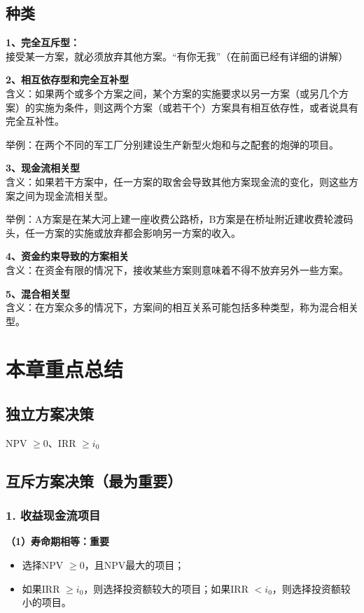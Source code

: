 \subsection{种类}
\textbf{1、完全互斥型：}\\
接受某一方案，就必须放弃其他方案。“有你无我”（在前面已经有详细的讲解）

\textbf{2、相互依存型和完全互补型}\\
含义：如果两个或多个方案之间，某个方案的实施要求以另一方案（或另几个方案）的实施为条件，则这两个方案（或若干个）方案具有相互依存性，或者说具有完全互补性。

举例：在两个不同的军工厂分别建设生产新型火炮和与之配套的炮弹的项目。

\textbf{3、现金流相关型}\\
含义：如果若干方案中，任一方案的取舍会导致其他方案现金流的变化，则这些方案之间为现金流相关型。

举例：A方案是在某大河上建一座收费公路桥，B方案是在桥址附近建收费轮渡码头，任一方案的实施或放弃都会影响另一方案的收入。

\textbf{4、资金约束导致的方案相关}\\
含义：在资金有限的情况下，接收某些方案则意味着不得不放弃另外一些方案。

\textbf{5、混合相关型}\\
含义：在方案众多的情况下，方案间的相互关系可能包括多种类型，称为混合相关型。

\section{本章重点总结}

\subsection{独立方案决策}
NPV $\geq 0$、IRR $\geq i_0$

\subsection{互斥方案决策（最为重要）}
\subsubsection{1. 收益现金流项目}
\textbf{（1）寿命期相等：重要}
\begin{itemize}
    \item 选择NPV $\geq 0$，且NPV最大的项目；
    \item 如果IRR $ \geq i_0$，则选择投资额较大的项目；如果IRR $< i_0$，则选择投资额较小的项目。
\end{itemize}

